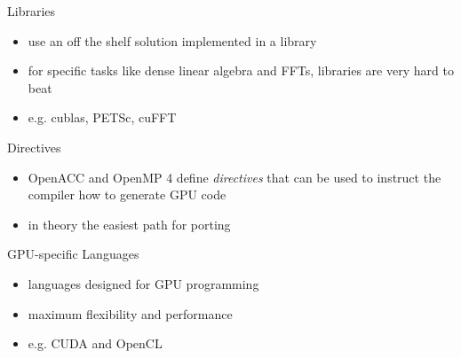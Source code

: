 \documentclass[aspectratio=43]{beamer}
\begin{document}
\begin{frame}[fragile]{}
    \begin{info}{Libraries}
        \begin{itemize}
            \item use an off the shelf solution implemented in a library
            \item for specific tasks like dense linear algebra and FFTs, libraries are very hard to beat
            \item e.g. cublas, PETSc, cuFFT
        \end{itemize}
    \end{info}

    \begin{info}{Directives}
        \begin{itemize}
            \item OpenACC and OpenMP 4 define \emph{directives} that can be used to instruct the compiler how to generate GPU code
            \item in theory the easiest path for porting
        \end{itemize}
    \end{info}

    \begin{info}{GPU-specific Languages}
        \begin{itemize}
            \item languages designed for GPU programming
            \item maximum flexibility and performance
            \item e.g. CUDA and OpenCL
        \end{itemize}
    \end{info}
\end{frame}
\end{document}
